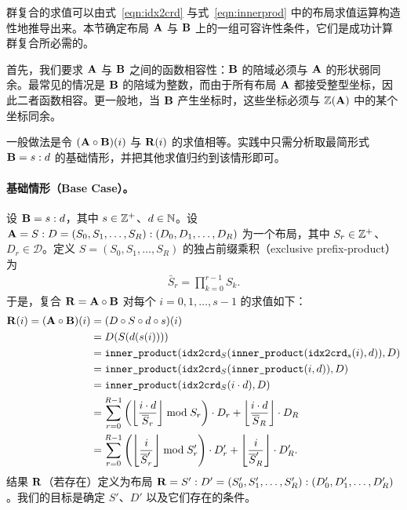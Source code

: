 \label{sec:composition_impl}

群复合的求值可以由式~\eqref{eqn:idx2crd} 与式~\eqref{eqn:innerprod} 中的布局求值运算构造性地推导出来。本节确定布局 $\mathbf{A}$ 与 $\mathbf{B}$ 上的一组可容许性条件，它们是成功计算群复合所必需的。

首先，我们要求 $\mathbf{A}$ 与 $\mathbf{B}$ 之间的函数相容性：$\mathbf{B}$ 的陪域必须与 $\mathbf{A}$ 的形状弱同余。最常见的情况是 $\mathbf{B}$ 的陪域为整数，而由于所有布局 $\mathbf{A}$ 都接受整型坐标，因此二者函数相容。更一般地，当 $\mathbf{B}$ 产生坐标时，这些坐标必须与 $\mathbb{Z}(\mathbf{A})$ 中的某个坐标同余。

一般做法是令 $(\mathbf{A} \circ \mathbf{B})(i)$ 与 $\mathbf{R}(i)$ 的求值相等。实践中只需分析取最简形式 $\mathbf{B} = s : d$ 的基础情形，并把其他求值归约到该情形即可。

\paragraph{基础情形（Base Case）。}

设 $\mathbf{B} = s : d$，其中 $s \in \mathbb{Z}^+$、$d \in \mathbb{N}$。设 $\mathbf{A} = S:D = (S_0, S_1, \ldots, S_R):(D_0, D_1, \ldots, D_R)$ 为一个布局，其中 $S_r \in \mathbb{Z}^+$、$D_r \in \mathcal{D}$。定义 $S = (S_0, S_1, \ldots, S_R)$ 的独占前缀乘积（exclusive prefix-product）为
\begin{align*}
\bar{S}_r = \prod_{k=0}^{r-1} S_k.
\end{align*}
于是，复合 $\mathbf{R} = \mathbf{A} \circ \mathbf{B}$ 对每个 $i = 0, 1, \ldots, s-1$ 的求值如下：
\begin{align}
\mathbf{R}(i) = (\mathbf{A} \circ \mathbf{B})(i) &= (D \circ S \circ d \circ s)(i) \nonumber \\
&= D(S(d(s(i)))) \nonumber\\
&= \texttt{inner\_product}(\texttt{idx2crd}_S(\texttt{inner\_product}(\texttt{idx2crd}_s(i), d)), D) \nonumber \\
&= \texttt{inner\_product}(\texttt{idx2crd}_S(\texttt{inner\_product}(i, d)), D) \nonumber \\
&= \texttt{inner\_product}(\texttt{idx2crd}_S(i \cdot d), D) \nonumber \\
&= \sum_{r=0}^{R-1} \left(\left\lfloor {\frac{i \cdot d}{\overline{S}_r}} \right\rfloor \bmod S_r\right) \cdot D_r + \left\lfloor {\frac{i \cdot d}{\overline{S}_R}} \right\rfloor \cdot D_R
\label{eqn:ABi} \\
&= \sum_{r=0}^{R-1} \left(\left\lfloor {\frac{i}{\overline{S}'_r}} \right\rfloor \bmod S'_r\right) \cdot D'_r + \left\lfloor {\frac{i}{\overline{S}'_R}} \right\rfloor \cdot D'_R. \nonumber
\end{align}
结果 $\mathbf{R}$（若存在）定义为布局 $\mathbf{R} = S':D' = (S'_0, S'_1, \ldots, S'_R):(D'_0, D'_1, \ldots, D'_R)$。我们的目标是确定 $S'$、$D'$ 以及它们存在的条件。

